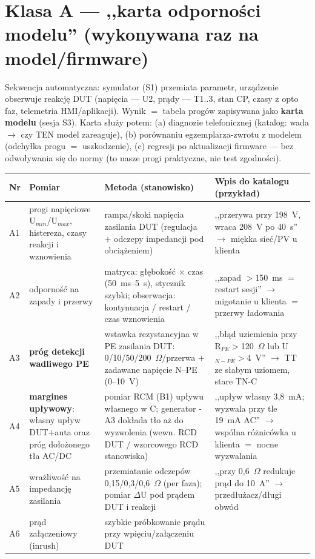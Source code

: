 \documentclass[11pt,a4paper]{article}
\newcommand{\ohm}{$\Omega$}
\begin{document}
\section{Klasa A --- ,,karta odporności modelu'' (wykonywana raz na model/firmware)}
Sekwencja automatyczna: symulator (S1) przemiata parametr, urządzenie obserwuje reakcję DUT
(napięcia --- U2, prądy --- T1..3, stan CP, czasy z opto faz, telemetria HMI/aplikacji).
Wynik $=$ tabela progów zapisywana jako \textbf{karta modelu} (sesja S3). Karta służy potem:
(a) diagnozie telefonicznej (katalog: wada $\to$ czy TEN model zareaguje), (b) porównaniu
egzemplarza-zwrotu z modelem (odchyłka progu $=$ uszkodzenie), (c) regresji po aktualizacji
firmware --- bez odwoływania się do normy (to nasze progi praktyczne, nie test zgodności).
\begin{longtable}{@{}p{}p{}p{}p{}@{}}
\toprule
\textbf{Nr} & \textbf{Pomiar} & \textbf{Metoda (stanowisko)} & \textbf{Wpis do katalogu (przykład)}\\
\midrule
A1 & progi napięciowe U$_{min}$/U$_{max}$, histereza, czasy reakcji i wznowienia & rampa/skoki
napięcia zasilania DUT (regulacja $+$ odczepy impedancji pod obciążeniem) & ,,przerywa przy
198~V, wraca 208~V po 40~s'' $\to$ miękka sieć/PV u klienta\\
A2 & odporność na zapady i przerwy & matryca: głębokość $\times$ czas (50~ms--5~s), stycznik
szybki; obserwacja: kontynuacja / restart / czas wznowienia & ,,zapad $>$150~ms $=$ restart
sesji'' $\to$ migotanie u klienta $=$ przerwy ładowania\\
A3 & \textbf{próg detekcji wadliwego PE} & wstawka rezystancyjna w PE zasilania DUT:
0/10/50/200~\ohm/przerwa $+$ zadawane napięcie N--PE (0--10~V) & ,,błąd uziemienia przy
R$_{PE}>$120~\ohm{} lub U$_{N-PE}>$4~V'' $\to$ TT ze słabym uziomem, stare TN-C\\
A4 & \textbf{margines upływowy}: własny upływ DUT$+$auta oraz próg dołożonego tła AC/DC &
pomiar RCM (B1) upływu własnego w C; generator -A3 dokłada tło aż do wyzwolenia (wewn.
RCD DUT / wzorcowego RCD stanowiska) & ,,upływ własny 3,8~mA; wyzwala przy tle 19~mA AC''
$\to$ wspólna różnicówka u klienta $=$ nocne wyzwalania\\
A5 & wrażliwość na impedancję zasilania & przemiatanie odczepów 0,15/0,3/0,6~\ohm{} (per faza);
pomiar $\Delta$U pod prądem DUT i reakcji & ,,przy 0,6~\ohm{} redukuje prąd do 10~A''
$\to$ przedłużacz/długi obwód\\
A6 & prąd załączeniowy (inrush) & szybkie próbkowanie prądu przy wpięciu/załączeniu DUT &

\end{longtable}
\end{document}
